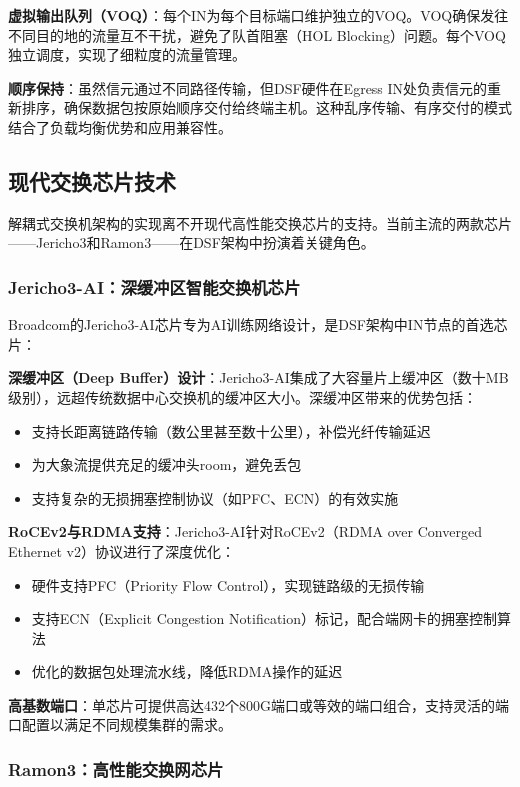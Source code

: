 \textbf{虚拟输出队列（VOQ）}：每个IN为每个目标端口维护独立的VOQ。VOQ确保发往不同目的地的流量互不干扰，避免了队首阻塞（HOL Blocking）问题。每个VOQ独立调度，实现了细粒度的流量管理。

\textbf{顺序保持}：虽然信元通过不同路径传输，但DSF硬件在Egress IN处负责信元的重新排序，确保数据包按原始顺序交付给终端主机。这种乱序传输、有序交付的模式结合了负载均衡优势和应用兼容性。

\subsection{现代交换芯片技术}

解耦式交换机架构的实现离不开现代高性能交换芯片的支持。当前主流的两款芯片——Jericho3和Ramon3——在DSF架构中扮演着关键角色。

\subsubsection{Jericho3-AI：深缓冲区智能交换机芯片}

Broadcom的Jericho3-AI芯片专为AI训练网络设计，是DSF架构中IN节点的首选芯片：

\textbf{深缓冲区（Deep Buffer）设计}：Jericho3-AI集成了大容量片上缓冲区（数十MB级别），远超传统数据中心交换机的缓冲区大小。深缓冲区带来的优势包括：
\begin{itemize}
    \item 支持长距离链路传输（数公里甚至数十公里），补偿光纤传输延迟
    \item 为大象流提供充足的缓冲头room，避免丢包
    \item 支持复杂的无损拥塞控制协议（如PFC、ECN）的有效实施
\end{itemize}

\textbf{RoCEv2与RDMA支持}：Jericho3-AI针对RoCEv2（RDMA over Converged Ethernet v2）协议进行了深度优化：
\begin{itemize}
    \item 硬件支持PFC（Priority Flow Control），实现链路级的无损传输
    \item 支持ECN（Explicit Congestion Notification）标记，配合端网卡的拥塞控制算法
    \item 优化的数据包处理流水线，降低RDMA操作的延迟
\end{itemize}

\textbf{高基数端口}：单芯片可提供高达432个800G端口或等效的端口组合，支持灵活的端口配置以满足不同规模集群的需求。

\subsubsection{Ramon3：高性能交换网芯片}

